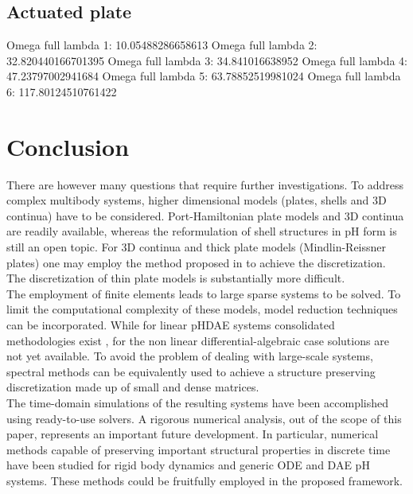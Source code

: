 \subsection{Actuated plate}


Omega full lambda 1: 10.05488286658613
Omega full lambda 2: 32.820440166701395
Omega full lambda 3: 34.841016638952
Omega full lambda 4: 47.23797002941684
Omega full lambda 5: 63.78852519981024
Omega full lambda 6: 117.80124510761422

\section{Conclusion}


There are however many questions that require further investigations. To address complex multibody systems, higher dimensional models (plates, shells and 3D continua) have to be considered. Port-Hamiltonian plate models and 3D continua are readily available, whereas the reformulation of shell structures in pH form is still an open topic. For 3D continua and thick plate models (Mindlin-Reissner plates) one may employ the method proposed in \cite{cohen2005} to achieve the discretization. The discretization of thin plate models is substantially more difficult. \\ 
The employment of finite elements leads to large sparse systems to be solved. To limit the computational complexity of these models, model reduction techniques can be incorporated. While for linear pHDAE systems consolidated methodologies exist \cite{egger2018}, for the  non linear differential-algebraic case solutions are not yet available. To avoid the problem of dealing with large-scale systems, spectral methods can be equivalently used to achieve a structure preserving discretization made up of small and dense matrices.  \\ 
The time-domain simulations of the resulting systems have been accomplished using ready-to-use solvers. A rigorous numerical analysis, out of the scope of this paper, represents an important future development. In particular, numerical methods capable of preserving important structural properties in discrete time have been studied for rigid body dynamics \cite{celledoni2018passivity} and generic ODE \cite{kotyczka2019discrete} and DAE \cite{mehrmann2019structurepreserving} pH systems. These methods could be fruitfully employed in the proposed framework. 